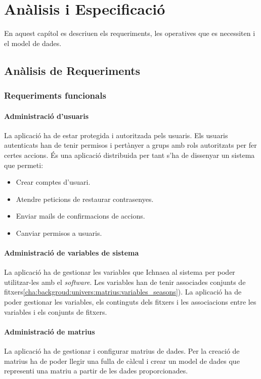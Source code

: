 \chapter{An\`{a}lisis i Especificaci\'{o}}
\label{cha:specification}
En aquest cap\'{i}tol es descriuen els requeriments, les operatives que es necessiten i el model de dades.

\section{An\`{a}lisis de Requeriments}

\subsection{Requeriments funcionals}
\subsubsection{Administraci\'{o} d'usuaris}
La aplicaci\'{o} ha de estar protegida i autoritzada pels usuaris. Els usuaris autenticats han de tenir permisos i  pertànyer a grups amb rols autoritzats per fer certes accions. \'{E}s una aplicaci\'{o} distribuida per tant s'ha de dissenyar un sistema que permeti:
\begin{itemize}
\item Crear comptes d'usuari.
\item Atendre peticions de restaurar contrasenyes.
\item Enviar mails de confirmacions de accions.
\item Canviar permisos a usuaris.
\end{itemize}

\subsubsection{Administraci\'{o} de variables de sistema}
La aplicaci\'{o} ha de gestionar les variables que Ichnaea al sistema per poder utilitzar-les amb el \textit{software}. Les variables han de tenir associades conjunts de fitxers\ref{cha:backgroud:univers:matrius:variables_seasons}). La aplicaci\'{o} ha de poder gestionar les variables, els continguts dels fitxers i les associacions entre les variables i els conjunts de fitxers.

\subsubsection{Administraci\'{o} de matrius}
La aplicaci\'{o} ha de gestionar i configurar matrius de dades. Per la creaci\'{o} de matrius ha de poder llegir una fulla de c\`{a}lcul i crear un model de dades que representi una matriu a partir de les dades proporcionades.\\

